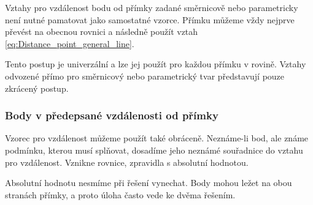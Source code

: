 \begin{remark}\label{rem:General_method_distance_point_line}
    Vztahy pro vzdálenost bodu od přímky zadané směrnicově nebo
    parametricky není nutné pamatovat jako samostatné vzorce.
    Přímku můžeme vždy nejprve převést na obecnou rovnici a následně
    použít vztah \eqref{eq:Distance_point_general_line}.

    Tento postup je univerzální a lze jej použít pro každou přímku
    v rovině. Vztahy odvozené přímo pro směrnicový nebo parametrický
    tvar představují pouze zkrácený postup.
\end{remark}


\subsubsection{Body v předepsané vzdálenosti od přímky}
\label{subsubsec:Points_given_distance_line}

Vzorec pro vzdálenost můžeme použít také obráceně. Neznáme-li bod,
ale známe podmínku, kterou musí splňovat, dosadíme jeho neznámé
souřadnice do vztahu pro vzdálenost. Vznikne rovnice, zpravidla
s absolutní hodnotou.

Absolutní hodnotu nesmíme při řešení vynechat. Body mohou ležet na
obou stranách přímky, a proto úloha často vede ke dvěma řešením.

